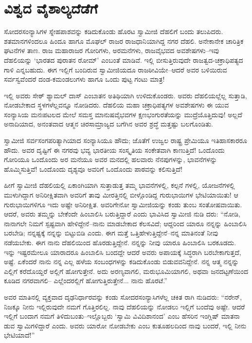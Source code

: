 
\chapter{ವಿಶ್ವದ ವೈಶಾಲ್ಯದೆಡೆಗೆ}

\noindent

ಸೋದರಸಂನ್ಯಾಸಿಗಳ ಸ್ನೇಹಪಾಶವನ್ನು ಕಡಿದುಕೊಂಡು ಹೊರಟ ಸ್ವಾಮೀಜಿ ದೆಹಲಿಗೆ ಬಂದು ತಲುಪಿದರು. ಶತಮಾನಗಳಿಂದಲೂ ಹಿಂದೂ ಹಾಗೂ ಮೊಘಲ್ ರಾಜರ ರಾಜಧಾನಿಯಾಗಿದ್ದ ನಗರ ದೆಹಲಿ. ಅನೇಕಾನೇಕ ಚಾರಿತ್ರಿಕ ಘಟನೆಗಳ ತಾಣ. ರಾಜ ಮಹಾರಾಜರ ಗೋರಿಗಳು, ಅರಮನೆಗಳು, ರಾಜವೈಭವದ ಅವಶೇಷಗಳು–ಇವು ದೆಹಲಿಯನ್ನು ‘ಭಾರತದ ಪುರಾತನ ರೋಮ್’ ಎಂಬಂತೆ ಮಾಡಿವೆ. ಇಲ್ಲಿ ಬೀಸುತ್ತಿರುವುದೇ ರಾಜತ್ವದ-ಚಕ್ರಾಧಿಪತ್ಯದ ಗಾಳಿ ಎನ್ನಬಹುದು. ಈಗ ಇಲ್ಲಿಗೆ ಬಂದಿರುವ ಸ್ವಾಮೀಜಿಯದೂ ರಾಜಠೀವಿಯೇ–ಆದರೆ ಅವರ ಬಳಿಯಿರುವ ಸರ್ವಸ್ವವೆಂದರೆ ದಂಡ-ಕಮಂಡಲುಗಳು ಹಾಗೂ ಒಂದು ಪುಟ್ಟ ಗಂಟು ಮಾತ್ರ!

ಇಲ್ಲಿ ಅವರು ಸೇಠ್ ಶ್ಯಾಮಲ್ ದಾಸ್ ಎಂಬಾತನ ಅತಿಥಿಯಾಗಿ ಉಳಿದುಕೊಂಡರು. ಅವರು ದೆಹಲಿಯಲ್ಲೆಲ್ಲ ಸುತ್ತಾಡಿ, ನೋಡಬೇಕಾದ ಸ್ಥಳಗಳೆಲ್ಲವನ್ನೂ ನೋಡಿದರು. ದೆಹಲಿಯ ಮಹಾ ಚಕ್ರಾಧಿಪತ್ಯಗಳ ಅವಶೇಷಗಳು ಈ ಯುವ ಸಂನ್ಯಾಸಿಯ ಮನಃಪಟಲದ ಮೇಲೆ ಸಮಸ್ತ ಮಾನುಷವೈಭವಗಳ ಕ್ಷಣಭಂಗುರತೆಯನ್ನು ಮುದ್ರೆಯೊತ್ತಿದುವು! ಅಲ್ಲದೆ ಅನಾದಿಯಾದ, ಅನಂತವಾದ ಆತ್ಮನ ಚಿರಸಾಮ್ರಾಜ್ಯದ ಬಗೆಗಿನ ಅವರ ಶ್ರದ್ಧೆ ಮತ್ತಷ್ಟು ಬಲಗೊಂಡಿತು.

ಸ್ವಾಮೀಜಿ ಸರ್ವಸಂಗಪರಿತ್ಯಾಗಿಯಾದ ಸಂನ್ಯಾಸಿಯೂ ಹೌದು; ಜೊತೆಗೆ ಉಜ್ವಲ ರಾಷ್ಟ್ರ ಪ್ರೇಮಿಯೂ ಇತಿಹಾಸಕಾರರೂ ಹೌದು. ಅವರ ದೃಷ್ಟಿಗೆ ಈ ನಗರವು ಭವ್ಯ ಭಾರತೀಯ ಸಂಸ್ಕೃತಿಯ ಸಂಕೇತವಾಗಿ ಕಾಣುತ್ತಿದೆ! ಒಂದೊಂದು ಗೋರಿಯೂ ಒಂದೊಂದು ಅರ ಮನೆಯೂ ಅವರ ಮನದಲ್ಲಿ ಹಲವಾರು ನೆನಪುಗಳನ್ನು, ಭಾವನೆಗಳನ್ನು ಹೊಮ್ಮಿಸುತ್ತಿವೆ! ಒಂದೊಂದು ದೃಶ್ಯವೂ ಅವರಿಗೆ ಒಂದೊಂದು ಪಾಠವನ್ನು ಕಲಿಸುತ್ತಿದೆ!

ಹೀಗೆ ಸ್ವಾಮೀಜಿ ದೆಹಲಿಯಲ್ಲಿ ಏಕಾಂಗಿಯಾಗಿ ಸುತ್ತಾಡುತ್ತ ತಮ್ಮ ಭಾವನೆಗಳಲ್ಲಿ, ಕಲ್ಪನೆ ಗಳಲ್ಲಿ, ಯೋಜನೆಗಳಲ್ಲಿ ಮುಳುಗಿದ್ದಾಗ ಅನಿರೀಕ್ಷಿತವಾಗಿ ಅವರಿಗೆ ತಾವು ಮೀರತ್ತಿನಲ್ಲಿ ಬೀಳ್ಗೊಂಡಿದ್ದ ಗುರುಭಾಯಿಗಳ ಭೇಟಿಯಾಯಿತು! ಆ ಗುರುಭಾಯಿಗಳಿಗೂ ಇದು ಅಷ್ಟೇ ಅನಿರೀಕ್ಷಿತ. ಅವರಿಗೇನೋ ಸ್ವಾಮೀಜಿಯನ್ನು ಕಂಡು ತುಂಬ ಸಂತೋಷವಾಯಿತು. ಆದರೆ, ಅವರು ತಮ್ಮನ್ನು ಬೇಕೆಂದೇ ಹಿಂಬಾಲಿಸಿ ಬರುತ್ತಿದ್ದಾರೆ ಎಂದು ಭಾವಿಸಿದ ಸ್ವಾಮೀಜಿ ನುಡಿ ದರು: “ನೋಡಿ, ನಾನಾಗಲೇ ನಿಮಗೆ ಸ್ಪಷ್ಟವಾಗಿ ಹೇಳಿದ್ದೇನೆ–ನಾನು ಮಾಡಬೇಕಾದ ಕೆಲಸವಿದೆ; ಆದ್ದರಿಂದ ಯಾರೂ ನನ್ನನ್ನು ಹಿಂಬಾಲಿಸಿ ಬರಬೇಡಿ; ನನ್ನಷ್ಟಕ್ಕೆ ನನ್ನನ್ನು ಬಿಟ್ಟುಬಿಡಿ ಎಂದು. ಈಗ ಮತ್ತೆ ಒತ್ತಿಹೇಳುತ್ತಿದ್ದೇನೆ–ನನ್ನ ಮಾತಿನಂತೆ ನೀವು ನಡೆಯಬೇಕು. ಈಗ ನಾನು ದೆಹಲಿಯಿಂದ ಹೊರಡುತ್ತಿದ್ದೇನೆ. ನನ್ನನ್ನು ನೀವು ಯಾರೂ ಹಿಂಬಾಲಿಸಿ ಬರಕೂಡದು. ಇನ್ನು ಇಷ್ಟರಮೇಲೂ ಯಾರಾದರೂ ಹಿಂಬಾಲಿಸಿ ಬಂದದ್ದೇ ಆದರೆ ಅವರು ಅಪಾಯಕ್ಕೆ ಸಿದ್ಧರಾಗಿ ಬರಬೇಕಾಗುತ್ತದೆ, ಅಷ್ಟೆ. ಏಕೆಂದರೆ ನಾನು ನನ್ನ ಎಲ್ಲ ಹಳೆಯ ಸಂಬಂಧಗಳನ್ನು ಕಡಿದುಕೊಂಡು ಬಿಡುವವನಿದ್ದೇನೆ. ನನ್ನ ಆತ್ಮ ನನ್ನನ್ನು ಎಲ್ಲಿಗೆ ಕರೆದೊಯ್ದರೆ ಅಲ್ಲಿಗೆ ಹೋಗುತ್ತೇನೆ. ಅದು ಅರಣ್ಯವಾಗಲಿ, ಮರುಭೂಮಿಯಾಗಲಿ, ಅಥವಾ ಜನದಟ್ಟಣೆಯಿಂದ ಕೂಡಿದ ನಗರವಾಗಲಿ– ಎಲ್ಲೆಂದರಲ್ಲಿಗೆ ಹೋಗುತ್ತಿರುತ್ತೇನೆ... ನಾನು ಹೊರಟೆ.”

ಅವರ ಮಾತಿನಲ್ಲಿ ವ್ಯಕ್ತವಾದ ದೃಢನಿರ್ಧಾರವನ್ನು ಕಂಡು ಸೋದರಸಂನ್ಯಾಸಿಗಳೆಲ್ಲ ಚಕಿತ ರಾಗಿ ನುಡಿದರು: “ನರೇನ್, ನಿಜಕ್ಕೂ ನೀನು ಇಲ್ಲಿರುವುದೇ ನಮಗೆ ಗೊತ್ತಿರಲಿಲ್ಲ. ನಾವು ದೆಹಲಿಯನ್ನು ನೋಡಲು ಇಲ್ಲಿಗೆ ಬಂದೆವು ಅಷ್ಟೇ. ಆದರೆ ಇಲ್ಲಿಗೆ ಬಂದಾಗ ನಮಗೆ ತಿಳಿದುಬಂತು–ಇಲ್ಲೊಬ್ಬರು ‘ಸ್ವಾಮಿ ವಿವಿದಿಶಾನಂದ’ ಎಂಬ ಹೆಸರಿನ ಇಂಗ್ಲಿಷ್ ಮಾತನಾ ಡುವ ಸ್ವಾಮಿಗಳಿದ್ದಾರೆ ಎಂದು. ಅವರು ಯಾರೋ ನೋಡಬೇಕು ಎಂಬ ಕುತೂಹಲದಿಂದ ನಾವು ಬಂದರೆ, ಇಲ್ಲಿ ನೀನು ಭೇಟಿಯಾದೆ!”

